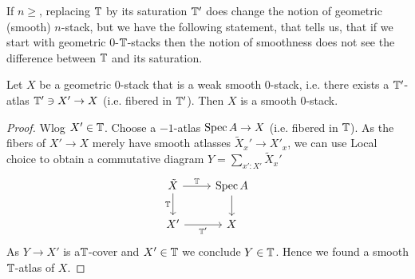 \documentclass{article}
\begin{document}
 If $n \ge $, replacing $\mathbb{T}$ by its saturation $\mathbb{T}'$ does change the notion of geometric (smooth) $n$-stack, but we have the following statement, that tells us, that if we start with geometric 0-$\mathbb{T}$-stacks then the notion of smoothness does not see the difference between $\mathbb{T}$ and its saturation. 
\begin{prop}
    Let $X$ be a geometric 0-stack that is a weak smooth 0-stack, i.e. there exists a $\mathbb{T}'$-atlas $\mathbb{T}' \ni X' \to X$ (i.e. fibered in $\mathbb{T}'$). Then $X$ is a smooth $0$-stack. 
\end{prop}
\begin{proof}
    Wlog $X' \in \mathbb{T}$. Choose a $-1$-atlas $\operatorname{Spec} A \to X$ (i.e. fibered in $\mathbb{T}$). As the fibers of $X' \to X$ merely have smooth atlasses $\tilde X_x' \to X'_x$, we can use Local choice to obtain a commutative diagram $Y = \sum_{x' : X'} \tilde X_x'$
\[\begin{tikzcd}
	{\tilde X} & {\Spec A} \\
	{X'} & X
	\arrow["\bT", from=1-1, to=1-2]
	\arrow["\bT"', from=1-1, to=2-1]
	\arrow[from=1-2, to=2-2]
	\arrow["{\bT'}"', from=2-1, to=2-2]
\end{tikzcd}\]
As $Y \to X'$ is a$\mathbb{T}$-cover and $X' \in \mathbb{T}$ we conclude $Y \in \mathbb{T}$. Hence we found a smooth $\mathbb{T}$-atlas of $X$. 
\end{proof}
\end{document}
